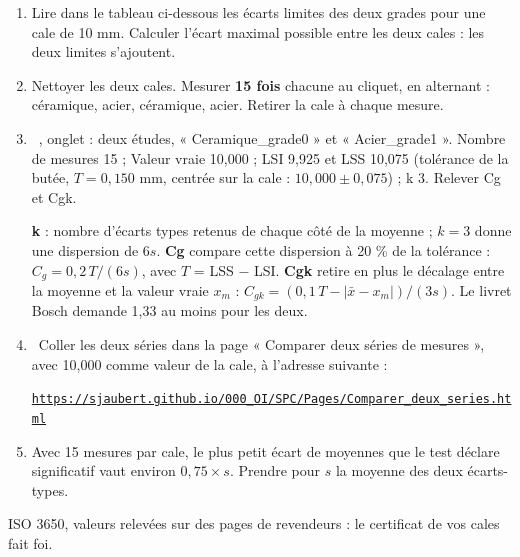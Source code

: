 \documentclass[10pt,a4paper]{article}
\begin{document}
\begin{enumerate}[label=\textcolor{cyan}{\textbf{\arabic*.}},leftmargin=15pt,itemsep=1.5pt]
\item Lire dans le tableau ci-dessous les écarts limites des deux grades pour une cale de 10 mm. Calculer l'écart maximal possible entre les deux cales : les deux limites s'ajoutent.
\item Nettoyer les deux cales. Mesurer \textbf{15 fois} chacune au cliquet, en alternant : céramique, acier, céramique, acier. Retirer la cale à chaque mesure.
\item \tagE\ , onglet  : deux études, « Ceramique\_grade0 » et « Acier\_grade1 ». Nombre de mesures 15 ; Valeur vraie 10,000 ; LSI 9,925 et LSS 10,075 (tolérance de la butée, $T = 0{,}150$ mm, centrée sur la cale : $10{,}000 \pm 0{,}075$) ; k 3. Relever Cg et Cgk.\par{\small \textbf{k} : nombre d'écarts types retenus de chaque côté de la moyenne ; $k=3$ donne une dispersion de $6s$. \textbf{Cg} compare cette dispersion à 20 \% de la tolérance : $C_g = 0{,}2\,T/(6s)$, avec $T$ = LSS $-$ LSI. \textbf{Cgk} retire en plus le décalage entre la moyenne et la valeur vraie $x_m$ : $C_{gk} = (0{,}1\,T - |\bar x - x_m|)/(3s)$. Le livret Bosch demande 1,33 au moins pour les deux.}
\item \tagW\ Coller les deux séries dans la page « Comparer deux séries de mesures », avec 10,000 comme valeur de la cale, à l'adresse suivante :\par\href{https://sjaubert.github.io/000_OI/SPC/Pages/Comparer_deux_series.html}{\nolinkurl{https://sjaubert.github.io/000_OI/SPC/Pages/Comparer_deux_series.html}}
\item Avec 15 mesures par cale, le plus petit écart de moyennes que le test déclare significatif vaut environ $0{,}75 \times s$. Prendre pour $s$ la moyenne des deux écarts-types.
\end{enumerate}
\par{\footnotesize ISO 3650, valeurs relevées sur des pages de revendeurs : le certificat de vos cales fait foi.}\par\vspace{5pt}
\end{document}
